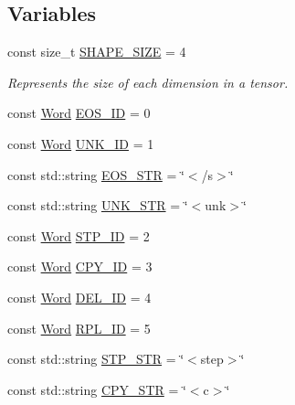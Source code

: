 \subsection*{Variables}
\begin{DoxyCompactItemize}
\item 
const size\+\_\+t \hyperlink{namespacemarian_a3df798260496f2cf8c2d39272ce213ad}{S\+H\+A\+P\+E\+\_\+\+S\+I\+ZE} = 4
\begin{DoxyCompactList}\small\item\em Represents the size of each dimension in a tensor. \end{DoxyCompactList}\item 
const \hyperlink{namespacemarian_a5db8bee455c97a62d6a525dc48efe4c2}{Word} \hyperlink{namespacemarian_a58eb44c6e8969831f40ee27feeed33ed}{E\+O\+S\+\_\+\+ID} = 0
\item 
const \hyperlink{namespacemarian_a5db8bee455c97a62d6a525dc48efe4c2}{Word} \hyperlink{namespacemarian_abe23e32294ac45b7fe50b5ee8d7da9ba}{U\+N\+K\+\_\+\+ID} = 1
\item 
const std\+::string \hyperlink{namespacemarian_ae9a4ff3b7d4df0a6ea4a710810c5b6f6}{E\+O\+S\+\_\+\+S\+TR} = \char`\"{}$<$/s$>$\char`\"{}
\item 
const std\+::string \hyperlink{namespacemarian_a85fabda4ef9ec625d0c992f81292dc92}{U\+N\+K\+\_\+\+S\+TR} = \char`\"{}$<$unk$>$\char`\"{}
\item 
const \hyperlink{namespacemarian_a5db8bee455c97a62d6a525dc48efe4c2}{Word} \hyperlink{namespacemarian_a5a9abba7ca69af7bf465e68f8f7169c5}{S\+T\+P\+\_\+\+ID} = 2
\item 
const \hyperlink{namespacemarian_a5db8bee455c97a62d6a525dc48efe4c2}{Word} \hyperlink{namespacemarian_a332a04943d2fc4bba824afc099e46190}{C\+P\+Y\+\_\+\+ID} = 3
\item 
const \hyperlink{namespacemarian_a5db8bee455c97a62d6a525dc48efe4c2}{Word} \hyperlink{namespacemarian_a3602e294027f4df7aeba04dd25e83db6}{D\+E\+L\+\_\+\+ID} = 4
\item 
const \hyperlink{namespacemarian_a5db8bee455c97a62d6a525dc48efe4c2}{Word} \hyperlink{namespacemarian_ae421bed2a0160f392a3c21bed9cabc73}{R\+P\+L\+\_\+\+ID} = 5
\item 
const std\+::string \hyperlink{namespacemarian_ac2ced42d12025e2b9688b345ac777ea7}{S\+T\+P\+\_\+\+S\+TR} = \char`\"{}$<$step$>$\char`\"{}
\item 
const std\+::string \hyperlink{namespacemarian_aafe70f6fe2652d0c8712f08bc4e2c8f6}{C\+P\+Y\+\_\+\+S\+TR} = \char`\"{}$<$c$>$\char`\"{}

\end{DoxyCompactItemize}
